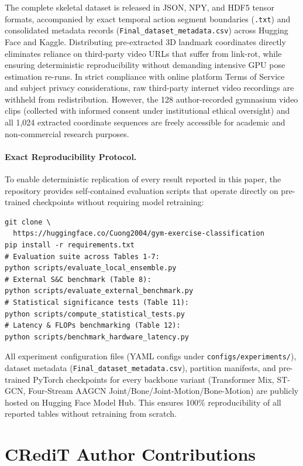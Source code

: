 \documentclass[preprint,12pt]{elsarticle}
\begin{document}
The complete skeletal dataset is released in JSON, NPY, and HDF5 tensor formats, accompanied by exact temporal action segment boundaries (\texttt{.txt}) and consolidated metadata records (\texttt{Final\_dataset\_metadata.csv}) across Hugging Face and Kaggle. Distributing pre-extracted 3D landmark coordinates directly eliminates reliance on third-party video URLs that suffer from link-rot, while ensuring deterministic reproducibility without demanding intensive GPU pose estimation re-runs. In strict compliance with online platform Terms of Service and subject privacy considerations, raw third-party internet video recordings are withheld from redistribution. However, the 128 author-recorded gymnasium video clips (collected with informed consent under institutional ethical oversight) and all 1,024 extracted coordinate sequences are freely accessible for academic and non-commercial research purposes.

\paragraph{Exact Reproducibility Protocol.} To enable deterministic replication of every result reported in this paper, the repository provides self-contained evaluation scripts that operate directly on pre-trained checkpoints without requiring model retraining:
\begin{footnotesize}
\begin{verbatim}
git clone \
  https://huggingface.co/Cuong2004/gym-exercise-classification
pip install -r requirements.txt
# Evaluation suite across Tables 1-7:
python scripts/evaluate_local_ensemble.py
# External S&C benchmark (Table 8):
python scripts/evaluate_external_benchmark.py
# Statistical significance tests (Table 11):
python scripts/compute_statistical_tests.py
# Latency & FLOPs benchmarking (Table 12):
python scripts/benchmark_hardware_latency.py
\end{verbatim}
\end{footnotesize}
All experiment configuration files (YAML configs under \texttt{configs/experiments/}), dataset metadata (\texttt{Final\_dataset\_metadata.csv}), partition manifests, and pre-trained PyTorch checkpoints for every backbone variant (Transformer Mix, ST-GCN, Four-Stream AAGCN Joint/Bone/Joint-Motion/Bone-Motion) are publicly hosted on Hugging Face Model Hub. This ensures 100\% reproducibility of all reported tables without retraining from scratch.

\section*{CRediT Author Contributions}
\end{document}
